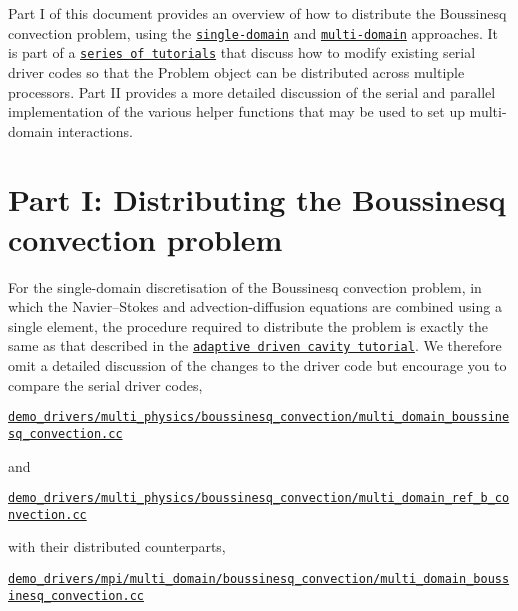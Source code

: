 Part I of this document provides an overview of how to distribute the Boussinesq convection problem, using the \href{../../../multi_physics/refine_b_convect/html/index.html}{\tt single-\/domain} and \href{../../../multi_physics/multi_domain_ref_b_convect/html/index.html}{\tt multi-\/domain} approaches. It is part of a \href{../../../example_code_list/html/index.html#distributed}{\tt series of tutorials} that discuss how to modify existing serial driver codes so that the {\ttfamily Problem} object can be distributed across multiple processors. Part II provides a more detailed discussion of the serial and parallel implementation of the various helper functions that may be used to set up multi-\/domain interactions.



 

\hypertarget{index_boussinesq}{}\section{Part I\+: Distributing the Boussinesq convection problem}\label{index_boussinesq}
For the single-\/domain discretisation of the Boussinesq convection problem, in which the Navier--Stokes and advection-\/diffusion equations are combined using a single element, the procedure required to distribute the problem is exactly the same as that described in the \href{../../adaptive_driven_cavity/html/index.html}{\tt adaptive driven cavity tutorial}. We therefore omit a detailed discussion of the changes to the driver code but encourage you to compare the serial driver codes,

\begin{center} \href{../../../../demo_drivers/multi_physics/boussinesq_convection/multi_domain_boussinesq_convection.cc}{\tt {\ttfamily demo\+\_\+drivers/multi\+\_\+physics/boussinesq\+\_\+convection/multi\+\_\+domain\+\_\+boussinesq\+\_\+convection.\+cc}} \end{center} 

and

\begin{center} \href{../../../../demo_drivers/multi_physics/boussinesq_convection/multi_domain_ref_b_convection.cc}{\tt {\ttfamily demo\+\_\+drivers/multi\+\_\+physics/boussinesq\+\_\+convection/multi\+\_\+domain\+\_\+ref\+\_\+b\+\_\+convection.\+cc}} \end{center} 

with their distributed counterparts,

\begin{center} \href{../../../../demo_drivers/mpi/multi_domain/boussinesq_convection/multi_domain_boussinesq_convection.cc}{\tt {\ttfamily demo\+\_\+drivers/mpi/multi\+\_\+domain/boussinesq\+\_\+convection/multi\+\_\+domain\+\_\+boussinesq\+\_\+convection.\+cc}} \end{center} 

